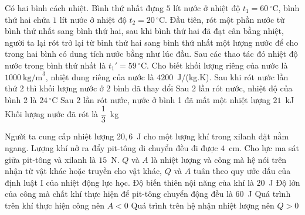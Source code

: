 	\begin{ex}%
		Có hai bình cách nhiệt. Bình thứ nhất đựng $5$ lít nước ở nhiệt độ $t_1=60\,^\circ\text{C}$, bình thứ hai chứa $1$ lít nước ở nhiệt độ $t_2=20\,^\circ\text{C}$. Đầu tiên, rót một phần nước từ bình thứ nhất sang bình thứ hai, sau khi bình thứ hai đã đạt cân bằng nhiệt, người ta lại rót trở lại từ bình thứ hai sang bình thứ nhất một lượng nước để cho trong hai bình có dung tích nước bằng như lúc đầu. Sau các thao tác đó nhiệt độ nước trong bình thứ nhất là $t_1'=59\,^\circ\text{C}$. Cho biết khối lượng riêng của nước là $1000~\text{kg/m}^3$, nhiệt dung riêng của nước là $4200$~J/(kg.K).
		\choiceTFt
		{Sau khi rót nước lần thứ 2 thì khối lượng nước ở 2 bình đã thay đổi}
		{Sau 2 lần rót nước, nhiệt độ của bình 2 là $24\,^\circ\text{C}$}
		{\True Sau 2 lần rót nước, nước ở bình 1 đã mất một nhiệt lượng $21$~kJ}
		{Khối lượng nước đã rót là $\dfrac{1}{3}$~kg}
	\end{ex}

	\begin{ex}%
		Người ta cung cấp nhiệt lượng $20{,}6$~J cho một lượng khí trong xilanh đặt nằm ngang. Lượng khí nở ra đẩy pit-tông di chuyển đều đi được $4$~cm. Cho lực ma sát giữa pit-tông và xilanh là $15$~N. $Q$ và $A$ là nhiệt lượng và công mà hệ nói trên nhận từ vật khác hoặc truyền cho vật khác, $Q$ và $A$ tuân theo quy ước dấu của định luật I của nhiệt động lực học.
		\choiceTFt
		{\True Độ biến thiên nội năng của khí là $20$~J}
		{Độ lớn của công mà chất khí thực hiện để pit-tông chuyển động đều là $60$~J}
		{\True Quá trình trên khí thực hiện công nên $A<0$}
		{\True Quá trình trên hệ nhận nhiệt lượng nên $Q>0$}
	\end{ex}

